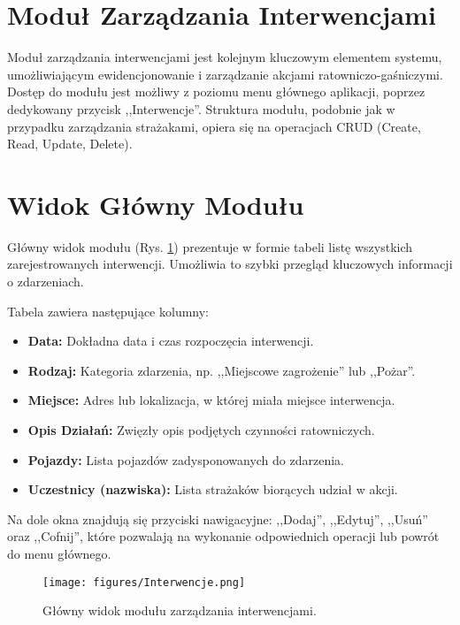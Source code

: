 \section{Moduł Zarządzania Interwencjami}
\label{chap:interwencje}

Moduł zarządzania interwencjami jest kolejnym kluczowym elementem systemu, umożliwiającym ewidencjonowanie i zarządzanie akcjami ratowniczo-gaśniczymi. Dostęp do modułu jest możliwy z poziomu menu głównego aplikacji, poprzez dedykowany przycisk ,,Interwencje''. Struktura modułu, podobnie jak w przypadku zarządzania strażakami, opiera się na operacjach CRUD (Create, Read, Update, Delete).

\section*{Widok Główny Modułu}
\label{sec:interwencje_widok}

Główny widok modułu (Rys. \ref{fig:interwencje_lista}) prezentuje w formie tabeli listę wszystkich zarejestrowanych interwencji. Umożliwia to szybki przegląd kluczowych informacji o zdarzeniach.


Tabela zawiera następujące kolumny:
\begin{itemize}
    \item \textbf{Data:} Dokładna data i czas rozpoczęcia interwencji.
    \item \textbf{Rodzaj:} Kategoria zdarzenia, np. ,,Miejscowe zagrożenie'' lub ,,Pożar''.
    \item \textbf{Miejsce:} Adres lub lokalizacja, w której miała miejsce interwencja.
    \item \textbf{Opis Działań:} Zwięzły opis podjętych czynności ratowniczych.
    \item \textbf{Pojazdy:} Lista pojazdów zadysponowanych do zdarzenia.
    \item \textbf{Uczestnicy (nazwiska):} Lista strażaków biorących udział w akcji.
\end{itemize}
Na dole okna znajdują się przyciski nawigacyjne: ,,Dodaj'', ,,Edytuj'', ,,Usuń'' oraz ,,Cofnij'', które pozwalają na wykonanie odpowiednich operacji lub powrót do menu głównego.

\begin{figure}[H]
	\centering
	\texttt{[image: figures/Interwencje.png]}
	\caption{Główny widok modułu zarządzania interwencjami.}
	\label{fig:interwencje_lista}
\end{figure}


